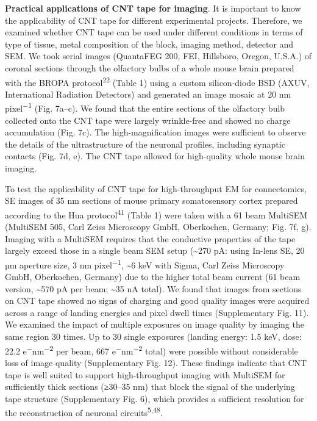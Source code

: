 \documentclass{article}
\begin{document}
\textbf{Practical applications of CNT tape for imaging}. It is important to know the applicability of CNT tape for different experimental projects. Therefore, we examined whether CNT tape can be used under different conditions in terms of type of tissue, metal composition of the block, imaging method, detector and SEM. We took serial images (QuantaFEG 200, FEI, Hillsboro, Oregon, U.S.A.) of coronal sections through the olfactory bulbs of a whole mouse brain prepared with the BROPA protocol\textsuperscript{22} (Table 1) using a custom silicon-diode BSD (AXUV, International Radiation Detectors) and generated an image mosaic at 20 nm pixel\textsuperscript{−1} (Fig. 7a–c). We found that the entire sections of the olfactory bulb collected onto the CNT tape were largely wrinkle-free and showed no charge accumulation (Fig. 7c). The high-magnification images were sufficient to observe the details of the ultrastructure of the neuronal profiles, including synaptic contacts (Fig. 7d, e). The CNT tape allowed for high-quality whole mouse brain imaging.

To test the applicability of CNT tape for high-throughput EM for connectomics, SE images of 35 nm sections of mouse primary somatosensory cortex prepared according to the Hua protocol\textsuperscript{41} (Table 1) were taken with a 61 beam MultiSEM (MultiSEM 505, Carl Zeiss Microscopy GmbH, Oberkochen, Germany; Fig. 7f, g). Imaging with a MultiSEM requires that the conductive properties of the tape largely exceed those in a single beam SEM setup (\textasciitilde{}270 pA: using In-lens SE, 20 µm aperture size, 3 nm pixel\textsuperscript{−1}, \textasciitilde{}6 keV with Sigma, Carl Zeiss Microscopy GmbH, Oberkochen, Germany) due to the higher total beam current (61 beam version, \textasciitilde{}570 pA per beam; \textasciitilde{}35 nA total). We found that images from sections on CNT tape showed no signs of charging and good quality images were acquired across a range of landing energies and pixel dwell times (Supplementary Fig. 11). We examined the impact of multiple exposures on image quality by imaging the same region 30 times. Up to 30 single exposures (landing energy: 1.5 keV, dose: 22.2 e\textsuperscript{−}nm\textsuperscript{−2} per beam, 667 e\textsuperscript{−}nm\textsuperscript{−2} total) were possible without considerable loss of image quality (Supplementary Fig. 12). These findings indicate that CNT tape is well suited to support high-throughput imaging with MultiSEM for sufficiently thick sections (≥30–35 nm) that block the signal of the underlying tape structure (Supplementary Fig. 6), which provides a sufficient resolution for the reconstruction of neuronal circuits\textsuperscript{5,48}.
\end{document}
